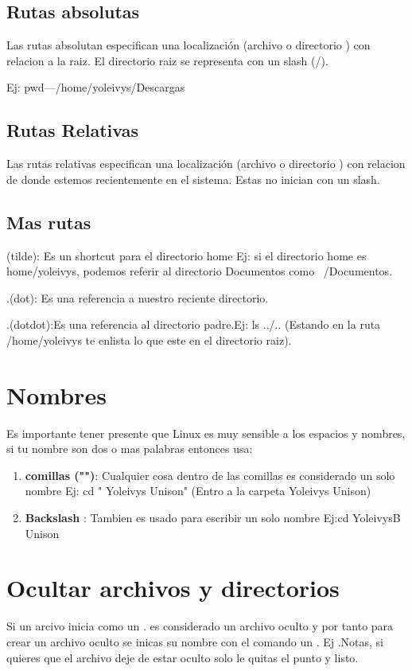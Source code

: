 \documentclass[12pt,a4paper]{article}
\begin{document}
\subsection{Rutas absolutas}
Las rutas absolutan especifican una localización (archivo o directorio ) con relacion a la raiz. El directorio raiz se representa con un  slash (/).

Ej: pwd---/home/yoleivys/Descargas
\subsection{Rutas Relativas}
Las rutas relativas especifican una localización (archivo o directorio ) con relacion de donde estemos recientemente en el sistema. Estas no inician con un slash.
\subsection{Mas rutas}

(tilde): Es un shortcut para el directorio home Ej: si el directorio home es home/yoleivys, podemos referir al directorio Documentos como ~/Documentos.

.(dot): Es una referencia a nuestro reciente directorio.

.(dotdot):Es una referencia al directorio padre.Ej: ls ../.. (Estando en la ruta /home/yoleivys te enlista lo que este en el directorio raiz).

\section{Nombres}
Es importante tener presente que Linux es muy sensible a los espacios y nombres, si tu nombre son dos o mas palabras entonces usa:
\begin{enumerate}
\item \textbf{comillas ("")}: Cualquier cosa dentro de las comillas es considerado un solo nombre Ej: cd " Yoleivys Unison" (Entro a la carpeta Yoleivys Unison)
\item \textbf{Backslash} : Tambien es usado para escribir un solo nombre Ej:cd YoleivysB Unison 
\end{enumerate}

\section{Ocultar archivos y directorios}
Si un arcivo inicia como un  . es considerado un archivo oculto y por tanto para crear un archivo oculto se inicas su nombre con el comando un  . Ej  .Notas, si quieres que el archivo deje de estar oculto solo le quitas el punto y listo.
\end{document}
